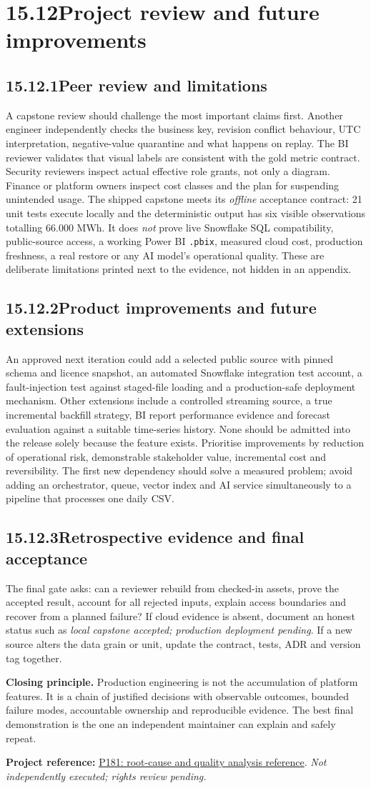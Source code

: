 \documentclass[11pt,twoside]{article}
\newcommand{\topic}[2]{\subsection*{#1\quad #2}}
\newcommand{\repo}[2]{\par\begingroup\fontsize{8.0}{9.6}\selectfont\sffamily\color{inkgray}\textbf{Project reference:} \href{#2}{#1}. \textit{Not independently executed; rights review pending.}\par\endgroup}
\begin{document}
\newpage

\section*{15.12\quad Project review and future improvements}
\topic{15.12.1}{Peer review and limitations}
A capstone review should challenge the most important claims first. Another engineer independently checks the business key, revision conflict behaviour, UTC interpretation, negative-value quarantine and what happens on replay. The BI reviewer validates that visual labels are consistent with the gold metric contract. Security reviewers inspect actual effective role grants, not only a diagram. Finance or platform owners inspect cost classes and the plan for suspending unintended usage.
The shipped capstone meets its \emph{offline} acceptance contract: 21 unit tests execute locally and the deterministic output has six visible observations totalling 66.000 MWh. It does \emph{not} prove live Snowflake SQL compatibility, public-source access, a working Power BI \texttt{.pbix}, measured cloud cost, production freshness, a real restore or any AI model's operational quality. These are deliberate limitations printed next to the evidence, not hidden in an appendix.
\topic{15.12.2}{Product improvements and future extensions}
An approved next iteration could add a selected public source with pinned schema and licence snapshot, an automated Snowflake integration test account, a fault-injection test against staged-file loading and a production-safe deployment mechanism. Other extensions include a controlled streaming source, a true incremental backfill strategy, BI report performance evidence and forecast evaluation against a suitable time-series history. None should be admitted into the release solely because the feature exists.
Prioritise improvements by reduction of operational risk, demonstrable stakeholder value, incremental cost and reversibility. The first new dependency should solve a measured problem; avoid adding an orchestrator, queue, vector index and AI service simultaneously to a pipeline that processes one daily CSV.
\topic{15.12.3}{Retrospective evidence and final acceptance}
The final gate asks: can a reviewer rebuild from checked-in assets, prove the accepted result, account for all rejected inputs, explain access boundaries and recover from a planned failure? If cloud evidence is absent, document an honest status such as \emph{local capstone accepted; production deployment pending}. If a new source alters the data grain or unit, update the contract, tests, ADR and version tag together.
\begin{insight}\textbf{Closing principle.} Production engineering is not the accumulation of platform features. It is a chain of justified decisions with observable outcomes, bounded failure modes, accountable ownership and reproducible evidence. The best final demonstration is the one an independent maintainer can explain and safely repeat.\end{insight}
\repo{P181: root-cause and quality analysis reference}{https://github.com/Snowflake-Labs/sfguide-root-cause-analysis-for-vehicle-product-quality-with-snowflake}
\end{document}
